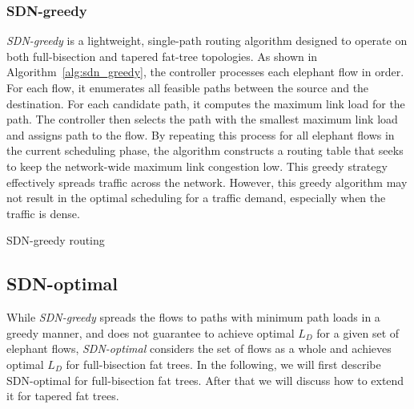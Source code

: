 \subsubsection{SDN-greedy}

\textit{SDN-greedy} is a lightweight, single-path routing algorithm
designed to operate on both full-bisection and tapered fat-tree
topologies. As shown in Algorithm~\ref{alg:sdn_greedy}, the controller
processes each elephant flow in order. For each flow, it enumerates
all feasible paths between the source and the destination. For each
candidate path, it computes the maximum link load for the path.
The controller then selects the path with the smallest maximum link load
and assigns path to the flow.
By repeating this process for all elephant flows in the current
scheduling phase, the algorithm constructs a routing table that seeks
to keep the network-wide maximum link congestion low. This greedy
strategy effectively spreads traffic across the network. However, this
greedy algorithm may not result in the optimal scheduling for a
traffic demand, especially when the traffic is dense. 

\begin{algorithm}[H]
\DontPrintSemicolon
\caption{SDN-greedy routing}
\label{alg:sdn_greedy}
\end{algorithm}

\subsection{SDN-optimal}

While \textit{SDN-greedy} spreads the flows to paths with minimum path
loads in a greedy manner, and does not guarantee to achieve optimal $L_D$ for
a given set of elephant flows, \textit{SDN-optimal} considers the set of flows
as a whole and achieves optimal $L_D$ for full-bisection fat trees.
In the following, we will first describe SDN-optimal for full-bisection fat
trees. After that we will discuss how to extend it for tapered fat trees. 

